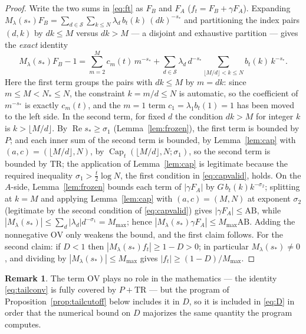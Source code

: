 \documentclass[11pt]{article}
\theoremstyle{definition}
\newtheorem{remark}[theorem]{Remark}
\newcommand{\calS}{\mathcal{S}}
\newcommand{\CapT}{\operatorname{Cap}}
\DeclareMathOperator{\Rea}{Re}
\begin{document}
\begin{proof}
Write the two sums in \eqref{eq:ft} as $F_B$ and $F_A$
($f_t=F_B+\gamma F_A$). Expanding
$M_\lambda(s_*)F_B=\sum_{d\in\calS}\sum_{k\le N}
\lambda_d\,b_t(k)\,(dk)^{-s_*}$ and partitioning the index pairs
$(d,k)$ by $dk\le M$ versus $dk>M$ --- a disjoint and exhaustive
partition --- gives the \emph{exact} identity
\begin{equation}\label{eq:tailconv}
M_\lambda(s_*)F_B-1
=\sum_{m=2}^{M}c_m(t)\,m^{-s_*}
+\sum_{d\in\calS}\lambda_d\,d^{-s_*}
\sum_{\lfloor M/d\rfloor<k\le N}b_t(k)\,k^{-s_*} .
\end{equation}
Here the first term groups the pairs with $dk\le M$ by $m=dk$: since
$m\le M<N_*\le N$, the constraint $k=m/d\le N$ is automatic, so the
coefficient of $m^{-s_*}$ is exactly $c_m(t)$, and the $m=1$ term
$c_1=\lambda_1b_t(1)=1$ has been moved to the left side. In the
second term, for fixed $d$ the condition $dk>M$ for integer $k$ is
$k>\lfloor M/d\rfloor$. By $\Rea s_*\ge\sigma_1$
(Lemma~\ref{lem:frozen}), the first term is bounded by $P$; and
each inner sum of the second term is bounded, by
Lemma~\ref{lem:cap} with $(a,c)=(\lfloor M/d\rfloor,N)$, by
$\CapT_t(\lfloor M/d\rfloor,N;\sigma_1)$, so the second term is
bounded by $\mathrm{TR}$; the application of Lemma~\ref{lem:cap} is
legitimate because the required inequality $\sigma_1>\frac t2\log N$,
the first condition in \eqref{eq:capvalid}, holds. On the $A$-side,
Lemma~\ref{lem:frozen} bounds each term of $|\gamma F_A|$ by
$G\,b_t(k)k^{-\sigma_2}$; splitting at $k=M$ and applying
Lemma~\ref{lem:cap} with $(a,c)=(M,N)$ at exponent $\sigma_2$
(legitimate by the second condition of \eqref{eq:capvalid}) gives
$|\gamma F_A|\le\mathrm{AB}$, while
$|M_\lambda(s_*)|\le\sum_d|\lambda_d|d^{-\sigma_1}=M_{\max}$;
hence $|M_\lambda(s_*)\gamma F_A|\le M_{\max}\mathrm{AB}$. Adding
the nonnegative $\mathrm{OV}$ only weakens the bound, and the first
claim follows. For the second claim: if $D<1$ then
$|M_\lambda(s_*)f_t|\ge1-D>0$; in particular
$M_\lambda(s_*)\neq0$, and dividing by
$|M_\lambda(s_*)|\le M_{\max}$ gives
$|f_t|\ge(1-D)/M_{\max}$.
\end{proof}

\begin{remark}
The term $\mathrm{OV}$ plays no role in the mathematics --- the
identity \eqref{eq:tailconv} is fully covered by $P+\mathrm{TR}$ ---
but the program of Proposition~\ref{prop:tailcutoff} below includes
it in $D$, so it is included in \eqref{eq:D} in order that the
numerical bound on $D$ majorizes the same quantity the program
computes.
\end{remark}
\end{document}
